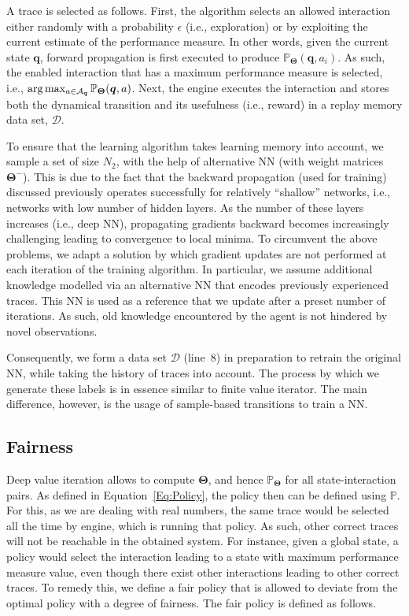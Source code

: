A trace is selected as follows. First, the algorithm selects an allowed interaction either randomly with a probability $\epsilon$ (i.e., exploration) or by exploiting the current estimate of the performance measure. In other words, given the current state $ \bm{q}$, forward propagation is first executed to produce  $\mathbb{P}_{\bm{\Theta}}( \bm{q},a_i)$. As such, the enabled interaction that has a maximum performance measure is selected, i.e., $\arg\max_{a\in {\cal A}_{\bm{q}}} \mathbb{P}_{\bm{\Theta}}(\bm{q},a)$. 
Next, the engine executes the interaction and stores both the dynamical transition and its usefulness (i.e., reward) in a replay memory data set, $\mathcal{D}$. 

To ensure that the learning algorithm takes learning memory into account, we sample a set of size $N_{2}$, with the help of alternative NN (with weight matrices $\bm{\Theta}^{-}$). This is due to the fact that the backward propagation (used for training) discussed previously operates successfully for relatively ``shallow'' networks, i.e., networks with low number of hidden layers. As the number of these layers increases (i.e., deep NN), propagating gradients backward becomes increasingly challenging leading to convergence to local minima. To circumvent the above problems, we adapt a solution by which gradient updates are not performed at each iteration of the training algorithm. In particular, we assume additional knowledge modelled via an alternative NN that encodes previously experienced traces. This NN is used as a reference that we update after a preset number of iterations. As such, old knowledge encountered by the agent is not hindered by novel observations. 

Consequently, we form a data set $\mathcal{D}$  (line~8)  in preparation to retrain the original NN, while taking the history of traces into account. The process by which we generate these labels is in essence similar to finite value iterator. The main difference, however, is the usage of sample-based transitions to train a NN.  


\subsection{Fairness}
Deep value iteration allows to compute $\bm{\Theta}$, and hence $\mathbb{P}_{\bm{\Theta}}$ for all state-interaction pairs. As defined in Equation~\ref{Eq:Policy}, the policy then can be defined using $\mathbb{P}$. For this, as we are dealing with real numbers, the same trace would be selected all the time by engine, which is running that policy. As such, other correct traces will not be reachable in the obtained system. For instance, given a global state, a policy would select the interaction leading to a state with maximum performance measure value, even though there exist other interactions leading to other correct traces. To remedy this, we define a fair policy that is allowed to deviate from the optimal policy with a degree of fairness.  The fair policy is defined as follows. 


